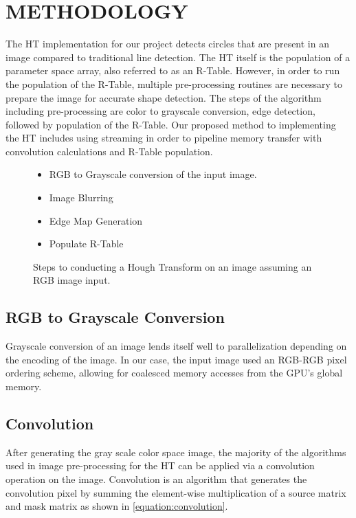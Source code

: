\documentclass[12pt]{article}
\begin{document}
\section{\MakeUppercase{Methodology}}
\label{sec:Methodology}
\noindent
The HT implementation for our project detects circles that are present in an image compared to traditional line detection.
The HT itself is the population of a parameter space array, also referred to as an R-Table.
However, in order to run the population of the R-Table, multiple pre-processing routines are necessary to prepare the image for accurate shape detection.
The steps of the algorithm including pre-processing are color to grayscale conversion, edge detection, followed by population of the R-Table.
Our proposed method to implementing the HT includes using streaming in order to pipeline memory transfer with convolution calculations and R-Table population.

\begin{figure}
  \begin{itemize}
    \item RGB to Grayscale conversion of the input image.
    \item Image Blurring 
    \item Edge Map Generation
    \item Populate R-Table
  \end{itemize}\caption{Steps to conducting a Hough Transform on an image assuming an RGB image input.}\label{figure:hough-transform-steps}
\end{figure}

\subsection{RGB to Grayscale Conversion}
\noindent
Grayscale conversion of an image lends itself well to parallelization depending on the encoding of the image.
In our case, the input image used an RGB-RGB pixel ordering scheme, allowing for coalesced memory accesses from the GPU's global memory.

\subsection{Convolution}
\noindent
After generating the gray scale color space image, the majority of the algorithms used in image pre-processing for the HT can be applied via a convolution operation on the image.
Convolution is an algorithm that generates the convolution pixel by summing the element-wise multiplication of a source matrix and mask matrix as shown in \ref{equation:convolution}.
\end{document}
